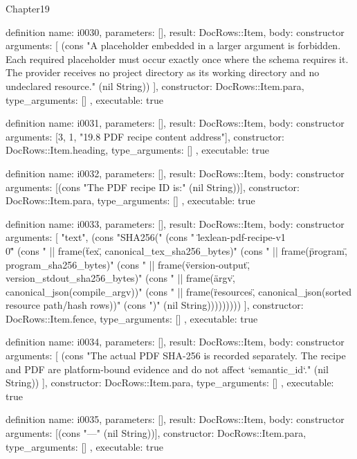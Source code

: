 \begin{lexlean}{Chapter19}
\begin{semanticmodule}
definition{
  name: i0030,
  parameters: [],
  result: DocRows::Item,
  body: constructor{
    arguments: [
      (cons "A placeholder embedded in a larger argument is forbidden. Each required placeholder must occur exactly once where the schema requires it. The provider receives no project directory as its working directory and no undeclared resource." (nil String))
    ],
    constructor: DocRows::Item.para,
    type_arguments: []
  },
  executable: true
}

definition{
  name: i0031,
  parameters: [],
  result: DocRows::Item,
  body: constructor{
    arguments: [3, 1, "19.8 PDF recipe content address"],
    constructor: DocRows::Item.heading,
    type_arguments: []
  },
  executable: true
}

definition{
  name: i0032,
  parameters: [],
  result: DocRows::Item,
  body: constructor{
    arguments: [(cons "The PDF recipe ID is:" (nil String))],
    constructor: DocRows::Item.para,
    type_arguments: []
  },
  executable: true
}

definition{
  name: i0033,
  parameters: [],
  result: DocRows::Item,
  body: constructor{
    arguments: [
      "text",
      (cons "SHA256(" (cons "  \"lexlean-pdf-recipe-v1\\0\"" (cons "  || frame(\"tex\", canonical_tex_sha256_bytes)" (cons "  || frame(\"program\", program_sha256_bytes)" (cons "  || frame(\"version-output\", version_stdout_sha256_bytes)" (cons "  || frame(\"argv\", canonical_json(compile_argv))" (cons "  || frame(\"resources\", canonical_json(sorted resource path/hash rows))" (cons ")" (nil String)))))))))
    ],
    constructor: DocRows::Item.fence,
    type_arguments: []
  },
  executable: true
}

definition{
  name: i0034,
  parameters: [],
  result: DocRows::Item,
  body: constructor{
    arguments: [
      (cons "The actual PDF SHA-256 is recorded separately. The recipe and PDF are platform-bound evidence and do not affect `semantic_id`." (nil String))
    ],
    constructor: DocRows::Item.para,
    type_arguments: []
  },
  executable: true
}

definition{
  name: i0035,
  parameters: [],
  result: DocRows::Item,
  body: constructor{
    arguments: [(cons "---" (nil String))],
    constructor: DocRows::Item.para,
    type_arguments: []
  },
  executable: true
}
\end{semanticmodule}
\end{lexlean}
